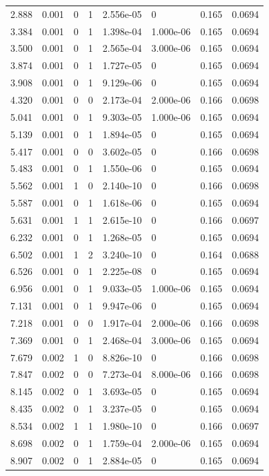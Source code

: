 \documentclass[preview]{standalone}
\begin{document}
{{\begin{tabular}{L{1.2cm}C{1.2cm} C{0.3cm}C{0.5cm} C{1.4cm}C{1.4cm} C{1.4cm}C{1.4cm}}
  2.888  &  0.001  & 0     &  1 &  2.556e-05  & 0  & 0.165 &  0.0694   \\ 
  3.384  &  0.001  & 0     &  1 &  1.398e-04  & 1.000e-06  & 0.165 &  0.0694   \\ 
  3.500  &  0.001  & 0     &  1 &  2.565e-04  & 3.000e-06  & 0.165 &  0.0694   \\ 
  3.874  &  0.001  & 0     &  1 &  1.727e-05  & 0  & 0.165 &  0.0694   \\ 
  3.908  &  0.001  & 0     &  1 &  9.129e-06  & 0  & 0.165 &  0.0694   \\ 
  4.320  &  0.001  & 0     &  0 &  2.173e-04  & 2.000e-06  & 0.166 &  0.0698   \\ 
  5.041  &  0.001  & 0     &  1 &  9.303e-05  & 1.000e-06  & 0.165 &  0.0694   \\ 
  5.139  &  0.001  & 0     &  1 &  1.894e-05  & 0  & 0.165 &  0.0694   \\ 
  5.417  &  0.001  & 0     &  0 &  3.602e-05  & 0  & 0.166 &  0.0698   \\ 
  5.483  &  0.001  & 0     &  1 &  1.550e-06  & 0  & 0.165 &  0.0694   \\ 
  5.562  &  0.001  & 1     &  0 &  2.140e-10  & 0  & 0.166 &  0.0698   \\ 
  5.587  &  0.001  & 0     &  1 &  1.618e-06  & 0  & 0.165 &  0.0694   \\ 
  5.631  &  0.001  & 1     &  1 &  2.615e-10  & 0  & 0.166 &  0.0697   \\ 
  6.232  &  0.001  & 0     &  1 &  1.268e-05  & 0  & 0.165 &  0.0694   \\ 
  6.502  &  0.001  & 1     &  2 &  3.240e-10  & 0  & 0.164 &  0.0688   \\ 
  6.526  &  0.001  & 0     &  1 &  2.225e-08  & 0  & 0.165 &  0.0694   \\ 
  6.956  &  0.001  & 0     &  1 &  9.033e-05  & 1.000e-06  & 0.165 &  0.0694   \\ 
  7.131  &  0.001  & 0     &  1 &  9.947e-06  & 0  & 0.165 &  0.0694   \\ 
  7.218  &  0.001  & 0     &  0 &  1.917e-04  & 2.000e-06  & 0.166 &  0.0698   \\ 
  7.369  &  0.001  & 0     &  1 &  2.468e-04  & 3.000e-06  & 0.165 &  0.0694   \\ 
  7.679  &  0.002  & 1     &  0 &  8.826e-10  & 0  & 0.166 &  0.0698   \\ 
  7.847  &  0.002  & 0     &  0 &  7.273e-04  & 8.000e-06  & 0.166 &  0.0698   \\ 
  8.145  &  0.002  & 0     &  1 &  3.693e-05  & 0  & 0.165 &  0.0694   \\ 
  8.435  &  0.002  & 0     &  1 &  3.237e-05  & 0  & 0.165 &  0.0694   \\ 
  8.534  &  0.002  & 1     &  1 &  1.980e-10  & 0  & 0.166 &  0.0697   \\ 
  8.698  &  0.002  & 0     &  1 &  1.759e-04  & 2.000e-06  & 0.165 &  0.0694   \\ 
  8.907  &  0.002  & 0     &  1 &  2.884e-05  & 0  & 0.165 &  0.0694   \\ 
\hline 
\end{tabular} 

}}
\end{document}
